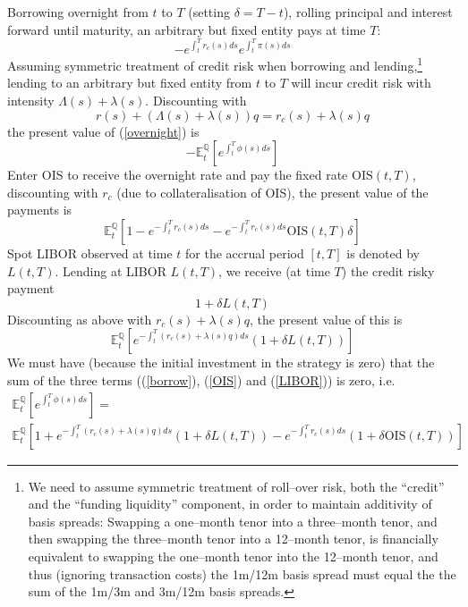 \documentclass[12pt,a4paper]{article}
\theoremstyle{plain}
\numberwithin{equation}{section}
\begin{document}
Borrowing overnight from $t$ to $T$ (setting $\delta=T-t$), rolling principal and interest forward until maturity, an arbitrary but fixed entity pays at time $T$:
\begin{equation}\label{overnight}
-e^{\int_t^Tr_c(s)ds}e^{\int_{t}^T\pi(s)ds}
\end{equation}
Assuming symmetric treatment of credit risk when borrowing and lending,\footnote{We need to assume symmetric treatment of roll--over risk, both the ``credit'' and the ``funding liquidity'' component, in order to maintain additivity of basis spreads: Swapping a one--month tenor into a three--month tenor, and then swapping the three--month tenor into a 12--month tenor, is financially equivalent to swapping the one--month tenor into the 12--month tenor, and thus (ignoring transaction costs) the 1m/12m basis spread must equal the the sum of the 1m/3m and 3m/12m basis spreads.} lending to an arbitrary but fixed entity from $t$ to $T$ will incur credit risk with intensity $\Lambda(s)+\lambda(s)$. Discounting with
$$
r(s)+(\Lambda(s)+\lambda(s))q=r_c(s)+\lambda(s)q
$$
the present value of (\ref{overnight}) is
\begin{equation}
-\mathbb{E}_t^\mathbb{Q}\left[e^{\int_{t}^T\phi(s)ds}\right] \label{borrow}
\end{equation}
Enter OIS to receive the overnight rate and pay the fixed rate $\text{OIS}(t,T)$, discounting with $r_c$ (due to collateralisation of OIS), the present value of the payments is
\begin{equation}
\mathbb{E}_t^\mathbb{Q}\left[1-e^{-\int_t^Tr_c(s)ds}-e^{-\int_t^Tr_c(s)ds}\text{OIS}(t,T)\delta\right] \label{OIS}
\end{equation}
Spot LIBOR observed at time $t$ for the accrual period $[t,T]$ is denoted by $L(t,T)$. Lending at LIBOR $L(t,T)$, we receive (at time $T$) the credit risky payment
$$
1+\delta L(t,T)
$$
Discounting as above with $r_c(s)+\lambda(s)q$, the present value of this is
\begin{equation}
\mathbb{E}_t^\mathbb{Q}\left[e^{-\int_{t}^T(r_c(s)+\lambda(s)q)ds}(1+\delta L(t,T))\right] \label{LIBOR}
\end{equation}
We must have (because the initial investment in the strategy is zero) that the sum of the three terms ((\ref{borrow}), (\ref{OIS}) and (\ref{LIBOR})) is zero, i.e.
\begin{multline} \label{noarb}
\mathbb{E}_t^\mathbb{Q}\left[e^{\int_{t}^T\phi(s)ds}\right]=\\
\mathbb{E}_t^\mathbb{Q}\left[1+e^{-\int_{t}^T(r_c(s)+\lambda(s)q)ds}(1+\delta L(t,T))-e^{-\int_t^Tr_c(s)ds}(1+\delta \text{OIS}(t,T))\right]
\end{multline}
\end{document}
